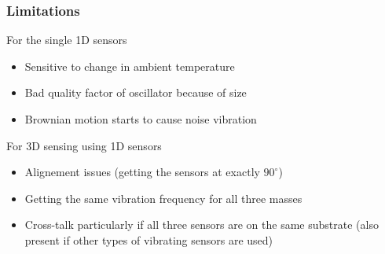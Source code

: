 \documentclass[10pt]{beamer}
\begin{document}

\begin{frame}
\frametitle{Limitations}
    For the single 1D sensors
    \begin{itemize}
        \item Sensitive to change in ambient temperature
        \item Bad quality factor of oscillator because of size
        \item Brownian motion starts to cause noise vibration
    \end{itemize}

    For 3D sensing using 1D sensors
    \begin{itemize}
        \item Alignement issues (getting the sensors at exactly $90^{\circ}$)
        \item Getting the same vibration frequency for all three masses
        \item Cross-talk particularly if all three sensors are on the same substrate (also present if other types of vibrating sensors are used)
    \end{itemize}
\end{frame}
\end{document}
